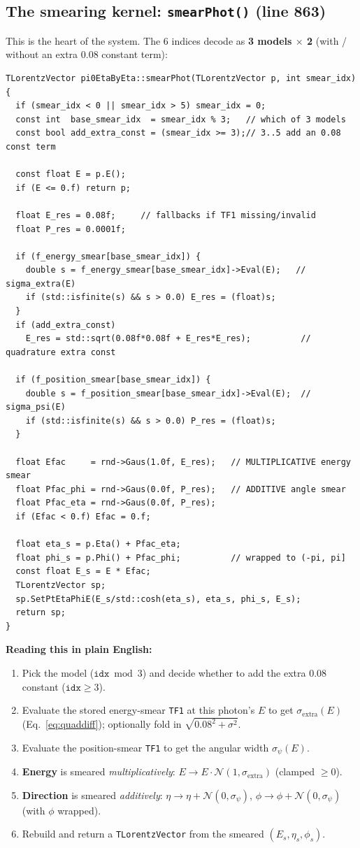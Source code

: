 \documentclass[11pt]{article}
\begin{document}
\subsection{The smearing kernel: \texttt{smearPhot()} (line 863)}
This is the heart of the system. The 6 indices decode as \textbf{3 models $\times$ 2}
(with / without an extra $0.08$ constant term):
\begin{lstlisting}[firstnumber=863]
TLorentzVector pi0EtaByEta::smearPhot(TLorentzVector p, int smear_idx) {
  if (smear_idx < 0 || smear_idx > 5) smear_idx = 0;
  const int  base_smear_idx  = smear_idx % 3;   // which of 3 models
  const bool add_extra_const = (smear_idx >= 3);// 3..5 add an 0.08 const term

  const float E = p.E();
  if (E <= 0.f) return p;

  float E_res = 0.08f;     // fallbacks if TF1 missing/invalid
  float P_res = 0.0001f;

  if (f_energy_smear[base_smear_idx]) {
    double s = f_energy_smear[base_smear_idx]->Eval(E);   // sigma_extra(E)
    if (std::isfinite(s) && s > 0.0) E_res = (float)s;
  }
  if (add_extra_const)
    E_res = std::sqrt(0.08f*0.08f + E_res*E_res);          // quadrature extra const

  if (f_position_smear[base_smear_idx]) {
    double s = f_position_smear[base_smear_idx]->Eval(E);  // sigma_psi(E)
    if (std::isfinite(s) && s > 0.0) P_res = (float)s;
  }

  float Efac     = rnd->Gaus(1.0f, E_res);   // MULTIPLICATIVE energy smear
  float Pfac_phi = rnd->Gaus(0.0f, P_res);   // ADDITIVE angle smear
  float Pfac_eta = rnd->Gaus(0.0f, P_res);
  if (Efac < 0.f) Efac = 0.f;

  float eta_s = p.Eta() + Pfac_eta;
  float phi_s = p.Phi() + Pfac_phi;          // wrapped to (-pi, pi]
  const float E_s = E * Efac;
  TLorentzVector sp;
  sp.SetPtEtaPhiE(E_s/std::cosh(eta_s), eta_s, phi_s, E_s);
  return sp;
}
\end{lstlisting}

\noindent\textbf{Reading this in plain English:}
\begin{enumerate}[nosep]
  \item Pick the model ($\texttt{idx}\bmod 3$) and decide whether to add the extra
        $0.08$ constant ($\texttt{idx}\ge3$).
  \item Evaluate the stored energy-smear \texttt{TF1} at this photon's $E$ to get
        $\sigma_{\text{extra}}(E)$ (Eq.~\eqref{eq:quaddiff}); optionally fold in
        $\sqrt{0.08^2+\sigma^2}$.
  \item Evaluate the position-smear \texttt{TF1} to get the angular width
        $\sigma_\psi(E)$.
  \item \textbf{Energy} is smeared \emph{multiplicatively}: $E\to E\cdot
        \mathcal{N}(1,\sigma_{\text{extra}})$ (clamped $\ge0$).
  \item \textbf{Direction} is smeared \emph{additively}: $\eta\to\eta+\mathcal{N}(0,\sigma_\psi)$,
        $\phi\to\phi+\mathcal{N}(0,\sigma_\psi)$ (with $\phi$ wrapped).
  \item Rebuild and return a \texttt{TLorentzVector} from the smeared
        $(E_s,\eta_s,\phi_s)$.
\end{enumerate}
\end{document}
